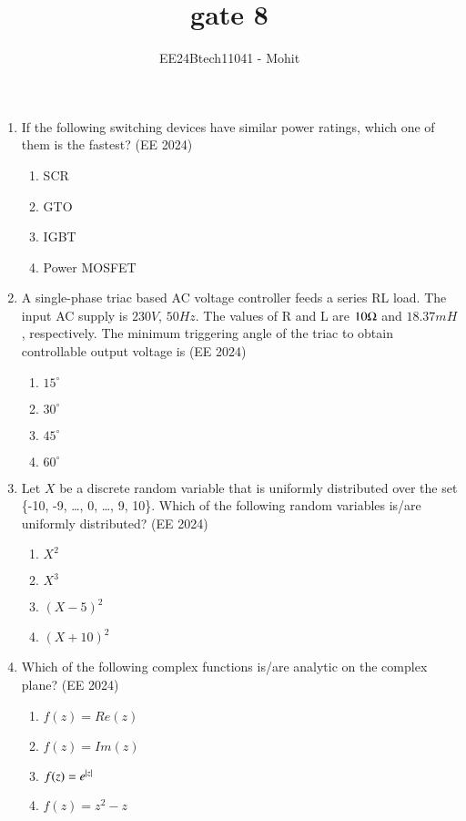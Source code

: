 \documentclass[journal,12pt,onecolumn]{IEEEtran}
\theoremstyle{remark}
\begin{document}
\title{gate 8}
\author{EE24Btech11041 - Mohit}
\maketitle
\renewcommand{\thefigure}{\theenumi}
\renewcommand{\thetable}{\theenumi}


\begin{enumerate}
\item If the following switching devices have similar power ratings, which one of them is the fastest?
\hfill{(EE 2024)}
\begin{enumerate}
\item SCR
\item GTO
\item IGBT
\item Power MOSFET
\end{enumerate}
\item  A single-phase triac based AC voltage controller feeds a series RL load. The input AC supply is $230 V$, $50 Hz$. The values of R and L are $10 \ohm$ and $18.37 mH$, respectively. The minimum triggering angle of the triac to obtain controllable output voltage is
\hfill{(EE 2024)}
\begin{enumerate}
\item $15^{\circ}$
\item $30^{\circ}$
\item $45^{\circ}$
\item $60^{\circ}$
\end{enumerate}
\item Let $X$ be a discrete random variable that is uniformly distributed over the set
\{-10, -9, \dots , 0, \dots , 9, 10\}. Which of the following random variables is/are
uniformly distributed?
\hfill{(EE 2024)}
\begin{enumerate}
\item $X^2$
\item $X^3$
\item $(X-5)^2$
\item $(X+10)^2$
\end{enumerate}
\item Which of the following complex functions is/are analytic on the complex plane?
\hfill{(EE 2024)}
\begin{enumerate}
\item $f(z)=Re(z)$
\item $f(z)=Im(z)$
\item $f(z)=e^{\left\vert z\right\vert}$
\item $f(z)=z^2-z$
\end{enumerate}

\end{enumerate}
\end{document}
